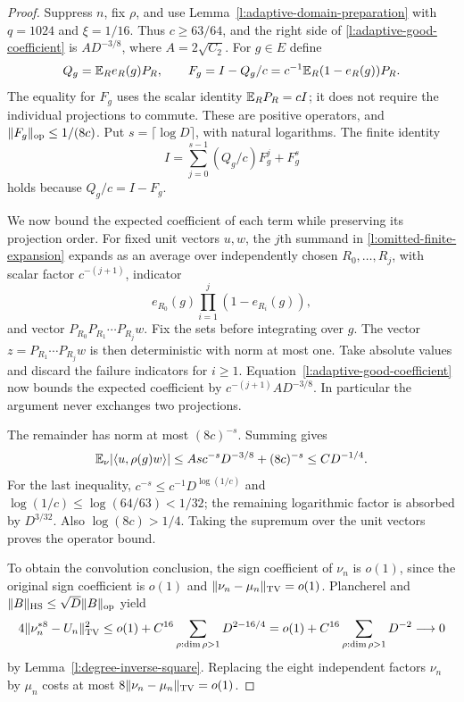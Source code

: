 \begin{proof}
Suppress $n$, fix $\rho$, and use Lemma~\ref{l:adaptive-domain-preparation}
with $q=1024$ and $\xi=1/16$. Thus $c\ge63/64$, and the
right side of \eqref{l:adaptive-good-coefficient} is
$A D^{-3/8}$, where $A=2\sqrt{C_2}$. For $g\in E$ define
\[
 Q_g=\mathbb E_R e_R(g)P_R,\qquad
 F_g=I-Q_g/c=c^{-1}\mathbb E_R(1-e_R(g))P_R.
\]
The equality for $F_g$ uses the scalar identity $\mathbb E_RP_R=cI$;
it does not require the individual projections to commute.
These are positive operators, and
$\|F_g\|_{\mathrm{op}}\le1/(8c)$. Put $s=\lceil\log D\rceil$, with
natural logarithms. The finite identity
\begin{equation}
 I=\sum_{j=0}^{s-1}(Q_g/c)F_g^j+F_g^s
 \label{l:omitted-finite-expansion}
\end{equation}
holds because $Q_g/c=I-F_g$.

We now bound the expected coefficient of each term while preserving its
projection order. For fixed unit vectors $u,w$, the $j$th summand in
\eqref{l:omitted-finite-expansion} expands as an average over independently
chosen $R_0,\ldots,R_j$, with scalar factor $c^{-(j+1)}$, indicator
\[
 e_{R_0}(g)\prod_{i=1}^j(1-e_{R_i}(g)),
\]
and vector $P_{R_0}P_{R_1}\cdots P_{R_j}w$. Fix the sets before
integrating over $g$. The vector $z=P_{R_1}\cdots P_{R_j}w$ is then
deterministic with norm at most one. Take absolute values and discard
the failure indicators for $i\ge1$. Equation~\eqref{l:adaptive-good-coefficient}
now bounds the expected coefficient by
$c^{-(j+1)}AD^{-3/8}$. In particular the argument never exchanges two
projections.

The remainder has norm at most $(8c)^{-s}$. Summing gives
\[
 \mathbb E_\nu|\langle u,\rho(g)w\rangle|
 \le As c^{-s}D^{-3/8}+(8c)^{-s}
 \le CD^{-1/4}.
\]
For the last inequality, $c^{-s}\le c^{-1}D^{\log(1/c)}$ and
$\log(1/c)\le\log(64/63)<1/32$; the remaining logarithmic factor is
absorbed by $D^{3/32}$. Also $\log(8c)>1/4$. Taking the supremum
over the unit vectors proves the operator bound.

To obtain the convolution conclusion, the sign coefficient of $\nu_n$
is $o(1)$, since the original sign coefficient is $o(1)$ and
$\|\nu_n-\mu_n\|_{\mathrm{TV}}=o(1)$. Plancherel and
$\|B\|_{\mathrm{HS}}\le\sqrt D\|B\|_{\mathrm{op}}$ yield
\[
 4\|\nu_n^{*8}-U_n\|_{\mathrm{TV}}^2
 \le o(1)+C^{16}\sum_{\rho:\dim\rho>1}D^{2-16/4}
 =o(1)+C^{16}\sum_{\rho:\dim\rho>1}D^{-2}\longrightarrow0
\]
by Lemma~\ref{l:degree-inverse-square}. Replacing the eight independent
factors $\nu_n$ by $\mu_n$ costs at most
$8\|\nu_n-\mu_n\|_{\mathrm{TV}}=o(1)$.
\end{proof}

